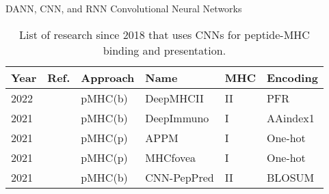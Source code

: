 \documentclass[10pt]{beamer}
\newcommand{\1}{
	\setbeamertemplate{background}{
		\texttt{[image: img/1]}
		\tikz[overlay] \fill[fill opacity=0.75,fill=white] (0,0) rectangle (-\paperwidth,\paperheight);
	}
}
\begin{document}
\begin{frame}{DANN, CNN, and RNN }{Convolutional Neural Networks}
	
	\fontsize{8pt}{5pt}\selectfont
	
	\begin{table}[]
		\centering
		\caption{List of research since 2018 that uses CNNs for peptide-MHC binding and presentation.}
		\setlength{\tabcolsep}{0.5em} %
		{\renewcommand{\arraystretch}{2}%
			\begin{tabular}{p{0.6cm}p{0.6cm}p{1.5cm}p{2cm}p{0.6cm}p{2.7cm}}
				\textbf{Year} & \textbf{Ref.}                              & \textbf{Approach}        & \textbf{Name} & \textbf{MHC} & \textbf{Encoding}                                                                                                                                                                                   \\ \hline
				
				2022 &	\cite{you2022deepmhcii}	& pMHC(b) &	DeepMHCII &	 II &	PFR \\
				
				2021          & \cite{li2021deepimmuno}   & pMHC(b)      & DeepImmuno    &  I        & AAindex1                                                \\
				2021          & \cite{lang2021neofox}     & pMHC(p) & APPM          &  I        & One-hot                                                                          \\
				2021          & \cite{lee2021connecting}  & pMHC(p) & MHCfovea      &  I        & One-hot                                                                                                      \\
				2021          & \cite{junet2021cnn}       & pMHC(b)      & CNN-PepPred   &  II       & BLOSUM     \\
				

\end{tabular}}
\end{table}
\end{frame}
\end{document}
